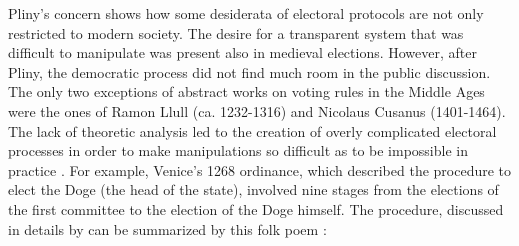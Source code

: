 Pliny's concern shows how some desiderata of electoral protocols are not only restricted to modern society. The desire for a transparent system that was difficult to manipulate was present also in medieval elections. However, after Pliny, the democratic process did not find much room in the public discussion. The only two exceptions of abstract works on voting rules in the Middle Ages were the ones of Ramon Llull (ca. 1232-1316) and Nicolaus Cusanus (1401-1464). The lack of theoretic analysis led to the creation of overly complicated electoral processes in order to make manipulations so difficult as to be impossible in practice \citep{Uckelman2010}. For example, Venice's 1268 ordinance, which described the procedure to elect the Doge (the head of the state), involved nine stages from the elections of the first committee to the election of the Doge himself. The procedure, discussed in details by \citet{Lines1986, Coggins1998, Mowbray2007} can be summarized by this folk poem \citep{Doglioni1666}:

